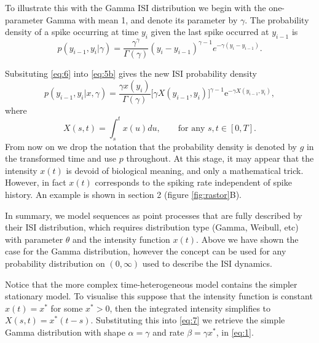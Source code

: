 \documentclass[../main.tex]{subfiles}
\begin{document}
To illustrate this with the Gamma ISI distribution we begin with the one-parameter Gamma with mean 1, and denote its parameter by $\gamma$. The probability density of a spike occurring at time $y_i$ given the last spike occurred at $y_{i-1}$ is
\begin{equation} \label{eq:6}
p(y_{i-1}, y_i | \gamma) = \frac{\gamma ^\gamma}{\Gamma (\gamma )} (y_i-y_{i-1})^{\gamma - 1}  e^{-\gamma \left( y_i-y_{i-1} \right) }.
\end{equation}

 Subsituting \eqref{eq:6} into \eqref{eq:5b} gives the new ISI probability density
 \begin{equation} \label{eq:7}
p(y_{i-1},y_i|x, \gamma) = \frac{\gamma x(y_i)}{\Gamma (\gamma)} \big[ \gamma X(y_{i-1},y_i) \big]^{\gamma - 1} \mathrm{e}^{-\gamma X(y_{i-1},y_i) },
\end{equation}
 where
 \begin{equation}\label{eq:8}
X(s,t) = \int^{t}_{s} x(u) du , \qquad \text{for any } s,t \in [0,T].
\end{equation}
 From now on we drop the notation that the probability density is denoted by $g$ in the transformed time and use $p$ throughout. 
At this stage, it may appear that the intensity $x(t)$ is devoid of biological meaning, and only a mathematical trick. However, in fact $x(t)$ corresponds to the spiking rate independent of spike history. An example is shown in section 2 (figure \ref{fig:rastor}B).

In summary, we model  sequences as point processes that are fully described by their ISI distribution, which requires distribution type (Gamma, Weibull, etc) with parameter $\theta$ and the intensity function $x(t)$. Above we have shown the case for the Gamma distribution, however the concept can be used for any probability distribution on $(0,\infty)$ used to describe the ISI dynamics.

Notice that the more complex time-heterogeneous model contains the simpler stationary model. To visualise this suppose that the intensity function is constant $x(t) = x^*$ for some $x^* > 0$, then the integrated intensity simplifies to $X(s,t) = x^*(t-s)$. Substituting this into \eqref{eq:7} we retrieve the simple Gamma distribution with shape $\alpha = \gamma $ and rate $ \beta = \gamma x^*$, in \eqref{eq:1}.  


\end{document}
